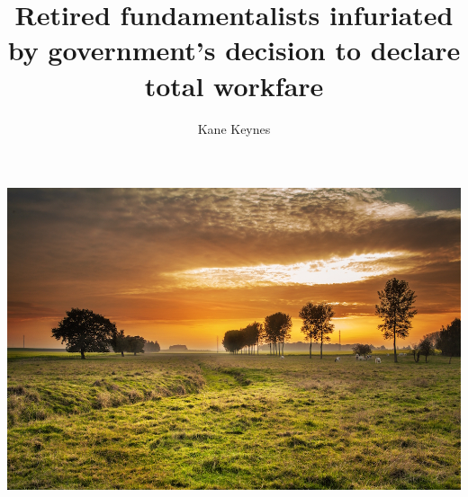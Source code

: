 \documentclass{gescons}
\title {Retired fundamentalists infuriated by government's decision to declare total workfare}
\author{Kane Keynes}
\begin{document}
    \maketitle

    
    
    
    \begin{multicols}{2}
        \begin{lead}
            \lipsum[1]
        \end{lead}

        \lipsum[2]
        
        \includegraphics[width=\columnwidth]{landscape}
        
        \lipsum[3-6]
    \end{multicols}
\end{document}
